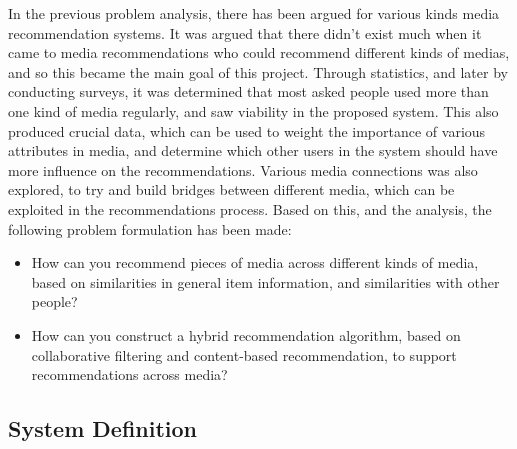 In the previous problem analysis, there has been argued for various kinds media recommendation systems. It was argued that there didn’t exist much when it came to media recommendations who could recommend different kinds of medias, and so this became the main goal of this project. Through statistics, and later by conducting surveys, it was determined that most asked people used more than one kind of media regularly, and saw viability in the proposed system. This also produced crucial data, which can be used to weight the importance of various attributes in media, and determine which other users in the system should have more influence on the recommendations. Various media connections was also explored, to try and build bridges between different media, which can be exploited in the recommendations process. Based on this, and the analysis, the following problem formulation has been made:

\begin{itemize}
	\item How can you recommend pieces of media across different kinds of media, based on similarities in general item information, and similarities with other people? 
	\item How can you construct a hybrid recommendation algorithm, based on collaborative filtering and content-based recommendation, to support recommendations across media? 
\end{itemize}

\subsection{System Definition}
\label{SysDefinition}
